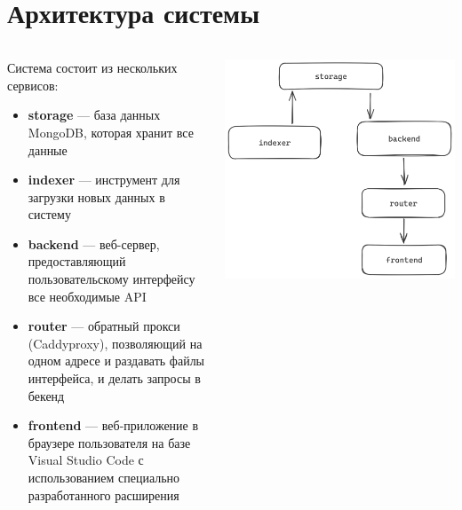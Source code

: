 \documentclass[aspectratio=169,professionalfonts,10pt]{beamer}
\begin{document}
\section{Архитектура системы}
\begin{frame}{\insertsection}

\begin{columns}
    \begin{column}{0.6\textwidth}
        Система состоит из нескольких сервисов:
        \begin{itemize}
            \item \textbf{storage} — база данных MongoDB, которая хранит все данные
            \item \textbf{indexer} — инструмент для загрузки новых данных в систему
            \item \textbf{backend} — веб-сервер, предоставляющий пользовательскому интерфейсу все необходимые API
            \item \textbf{router} — обратный прокси (Caddyproxy), позволяющий на одном адресе и раздавать файлы интерфейса, и делать запросы в бекенд
            \item \textbf{frontend} — веб-приложение в браузере пользователя на базе Visual Studio Code с использованием специально разработанного расширения
        \end{itemize}
    \end{column}
    \begin{column}{0.4\textwidth}
        \includegraphics[width=\textwidth]{figures/architecture.png}
    \end{column}
\end{columns}

\end{frame}
\end{document}
